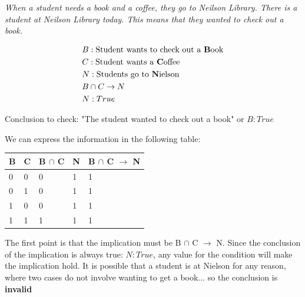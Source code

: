 \documentclass[12pt]{article}
\newenvironment{question}[2][Question]{\begin{trivlist}
\item[\hskip \labelsep {\bfseries #1}\hskip \labelsep {\bfseries #2.}]}{\end{trivlist}}
\newenvironment{solution}[1][Solution:]{\begin{trivlist}
\item[\hskip \labelsep {\bfseries #1}\hskip \labelsep {\bfseries}]\color{blue}}{\end{trivlist}}
\begin{document}
\begin{question}{1}
\begin{enumerate}[(a)]
 
	\item \textit{When a student needs a book and a coffee,  they go to Neilson Library. There is a student at Neilson Library today. This means that they wanted to check out a book.}
    \begin{solution}
        \begin{align*}
        &B : \text{Student wants to check out a \textbf{B}ook} \\
        &C : \text{Student wants a \textbf{C}offee} \\
        &N : \text{Students go to \textbf{N}ielson} \\
        &B \cap C \rightarrow N \\
        &N : True \\
        \end{align*}

        Conclusion to check: "The student wanted to check out a book"
        or $B : True$

        We can express the information in the following table:

\begin{table}[h!]
\begin{tabular}{|l|l|l|l|l|}
\hline
B & C & B $\cap$ C & N & B $\cap$ C $\rightarrow$ N \\ \hline
0 & 0 & 0                       & 1 & 1                              \\ \hline
0 & 1 & 0                       & 1 & 1                              \\ \hline
1 & 0 & 0                       & 1 & 1                              \\ \hline
1 & 1 & 1                       & 1 & 1                              \\ \hline
\end{tabular}
\end{table}


        The first point is that the implication must be B $\cap$ C $\rightarrow$ N. Since the conclusion of the implication is always true: $N:True$, any value for the condition will make the implication hold. It is possible that a student is at Nielson for any reason, where two cases do not involve wanting to get a book... so the conclusion is \textbf{invalid}  
    \end{solution}
    
\end{enumerate}
\end{question}
\end{document}
